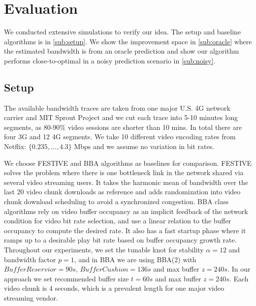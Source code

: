 
\section{Evaluation} \label{sec:evaluation}
We conducted extensive simulations to verify our idea. The setup and baseline algorithms is in \autoref{sub:setup}. We show the improvement space in \autoref{sub:oracle} where the estimated bandwidth is from an oracle prediction and show our algorithm performs close-to-optimal in a noisy prediction scenario in \autoref{sub:noisy}. 

\subsection{Setup} \label{sub:setup}
 The available bandwidth traces are taken from one major U.S. 4G network carrier and MIT Sprout Project\cite{Sprout} and we cut each trace into 5-10 minutes long segments, as 80-90\% video sessions are shorter than 10 mins.\cite{ATTVIDEO} In total there are four 3G and 12 4G segments. We take 10 different video encoding rates from Netflix: $\{0.235,\dots, 4.3\}$ Mbps and we assume no variation in bit rates. 

We choose FESTIVE \cite{Festive} and BBA \cite{BBA} algorithms as baselines for comparison. FESTIVE solves the problem where there is one bottleneck link in the network shared via several video streaming users. It takes the harmonic mean of bandwidth over the last 20 video chunk downloads as reference and adds randomization into video chunk download scheduling to avoid a synchronized congestion. BBA class algorithms rely on video buffer occupancy as an implicit feedback of the network condition for video bit rate selection, and use a linear relation to the buffer occupancy to compute the desired rate. It also has a fast startup phase where it ramps up to a desirable play bit rate based on buffer occupancy growth rate. Throughout our experiments, we set the tunable knot for stability $\alpha =12 $ and bandwidth factor $p=1$, and in BBA we are using BBA(2) with $BufferReservior=90s$, $BufferCushion=136s$ and max buffer $z=240s$. In our approach we set recommended buffer size $t=60s$ and max buffer $z=240s$. Each video chunk is 4 seconds, which is a prevalent length for one major video streaming vendor. 






